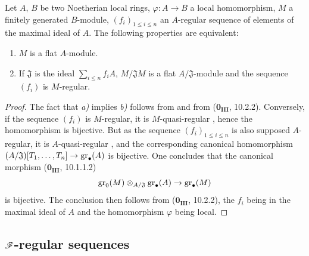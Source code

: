 \begin{proposition}[15.1.21]
\label{0.15.1.21}
Let $A$, $B$ be two Noetherian local rings, $\varphi:A\to B$ a local homomorphism, $M$ a finitely generated $B$-module, $(f_i)_{1\leq i\leq n}$ an $A$-regular sequence of elements of the maximal ideal of $A$.
The following properties are equivalent:
\begin{enumerate}
  \item[\textup{a)}] $M$ is a flat $A$-module.
  \item[\textup{b)}] If $\mathfrak{J}$ is the ideal $\sum_{i\leq n}f_iA$, $M/\mathfrak{J}M$ is a flat $A/\mathfrak{J}$-module and the sequence $(f_i)$ is $M$-regular.
\end{enumerate}
\end{proposition}

\begin{proof}
The fact that \emph{a)} implies \emph{b)} follows from  and from ($\mathbf{0_{III}}$, 10.2.2).
Conversely, if the sequence $(f_i)$ is $M$-regular, it is $M$-quasi-regular , hence the homomorphism  is bijective.
But as the sequence $(f_i)_{1\leq i\leq n}$ is also supposed $A$-regular, it is $A$-quasi-regular , and the corresponding canonical homomorphism $(A/\mathfrak{J})[T_1,\ldots,T_n]\to\operatorname{gr}_\bullet(A)$ is bijective.
One concludes that the canonical morphism ($\mathbf{0_{III}}$, 10.1.1.2)
\[
  \operatorname{gr}_0(M)\otimes_{A/\mathfrak{J}}\operatorname{gr}_\bullet(A) \to \operatorname{gr}_\bullet(M)
\]
is bijective.
The conclusion then follows from ($\mathbf{0_{III}}$, 10.2.2), the $f_i$ being in the maximal ideal of $A$ and the homomorphism $\varphi$ being local.
\end{proof}

\subsection{\texorpdfstring{$\mathscr{F}$}{F}-regular sequences}
\label{subsection:0.15.2}

